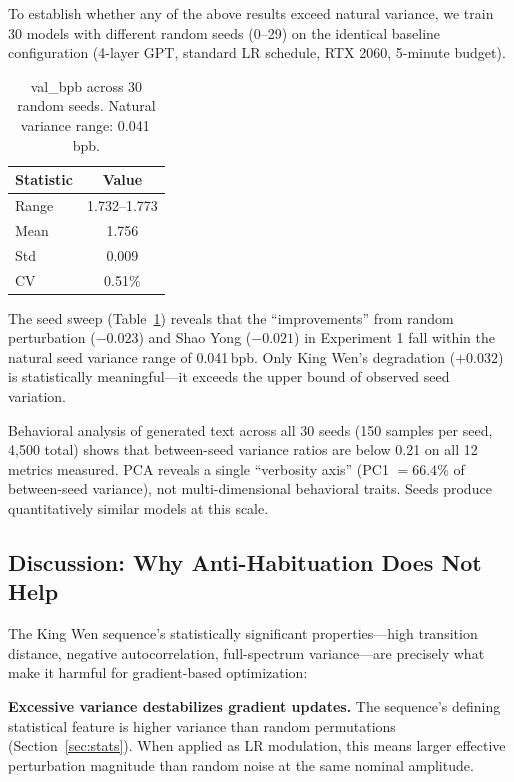 \documentclass{article}
\begin{document}
To establish whether any of the above results exceed natural variance, we train 30 models with different random seeds (0--29) on the identical baseline configuration (4-layer GPT, standard LR schedule, RTX 2060, 5-minute budget).

\begin{table}[h]
\centering
\begin{tabular}{lc}
\toprule
\textbf{Statistic} & \textbf{Value} \\
\midrule
Range & 1.732--1.773 \\
Mean & 1.756 \\
Std & 0.009 \\
CV & 0.51\% \\
\bottomrule
\end{tabular}
\caption{val\_bpb across 30 random seeds. Natural variance range: 0.041\,bpb.}
\label{tab:seeds}
\end{table}

The seed sweep (Table~\ref{tab:seeds}) reveals that the ``improvements'' from random perturbation ($-0.023$) and Shao Yong ($-0.021$) in Experiment 1 fall within the natural seed variance range of 0.041\,bpb. Only King Wen's degradation ($+0.032$) is statistically meaningful---it exceeds the upper bound of observed seed variation.

Behavioral analysis of generated text across all 30 seeds (150 samples per seed, 4,500 total) shows that between-seed variance ratios are below 0.21 on all 12 metrics measured. PCA reveals a single ``verbosity axis'' (PC1 $= 66.4\%$ of between-seed variance), not multi-dimensional behavioral traits. Seeds produce quantitatively similar models at this scale.

\subsection{Discussion: Why Anti-Habituation Does Not Help}

The King Wen sequence's statistically significant properties---high transition distance, negative autocorrelation, full-spectrum variance---are precisely what make it harmful for gradient-based optimization:

\textbf{Excessive variance destabilizes gradient updates.} The sequence's defining statistical feature is higher variance than random permutations (Section~\ref{sec:stats}). When applied as LR modulation, this means larger effective perturbation magnitude than random noise at the same nominal amplitude.
\end{document}
